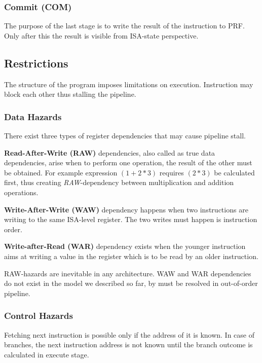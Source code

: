\subsubsection{Commit (COM)}

The purpose of the last stage is to write the result of the instruction to PRF. Only after this the result is visible from ISA-state perspective.

\subsection{Restrictions}

The structure of the program imposes limitations on execution. Instruction may block each other thus stalling the pipeline. 

\subsubsection{Data Hazards}

There exist three types of register dependencies that may cause pipeline stall.

\textbf{Read-After-Write (RAW)} dependencies, also called as true data dependencies, arise when to perform one operation, the result of the other must be obtained. For example expression $(1 + 2 * 3)$ requires $(2 * 3)$ be calculated first, thus creating \textit{RAW}-dependency between multiplication and addition operations.

\textbf{Write-After-Write (WAW)} dependency happens when two instructions are writing to the same ISA-level register. The two writes must happen is instruction order.

\textbf{Write-after-Read (WAR)} dependency exists when the younger instruction aims at writing a value in the register which is to be read by an older instruction.

RAW-hazards are inevitable in any architecture. WAW and WAR dependencies do not exist in the model we described so far, by must be resolved in out-of-order pipeline.

\subsubsection{Control Hazards}

Fetching next instruction is possible only if the address of it is known. In case of branches, the next instruction address is not known until the branch outcome is calculated in execute stage.

